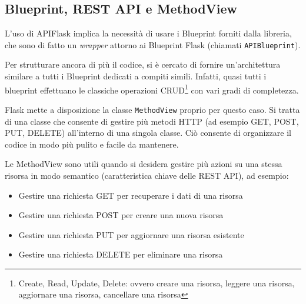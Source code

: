 \subsection{Blueprint, REST API e MethodView}
L'uso di APIFlask implica la necessità di usare i Blueprint forniti dalla libreria, che sono di fatto un \emph{wrapper} attorno ai Blueprint Flask (chiamati \texttt{APIBlueprint}).

Per strutturare ancora di più il codice, si è cercato di fornire un'architettura similare a tutti i Blueprint dedicati a compiti simili. Infatti, quasi tutti i blueprint effettuano le classiche operazioni CRUD\footnote{Create, Read, Update, Delete: ovvero creare una risorsa, leggere una risorsa, aggiornare una risorsa, cancellare una risorsa} con vari gradi di completezza.

Flask mette a disposizione la classe \texttt{MethodView} proprio per questo caso. Si tratta di una classe che consente di gestire più metodi HTTP (ad esempio GET, POST, PUT, DELETE) all'interno di una singola classe. Ciò consente di organizzare il codice in modo più pulito e facile da mantenere.

Le MethodView sono utili quando si desidera gestire più azioni su una stessa risorsa in modo semantico (caratteristica chiave delle REST API), ad esempio:
\begin{itemize}
    \item Gestire una richiesta GET per recuperare i dati di una risorsa
    \item Gestire una richiesta POST per creare una nuova risorsa
    \item Gestire una richiesta PUT per aggiornare una risorsa esistente
    \item Gestire una richiesta DELETE per eliminare una risorsa
\end{itemize}

